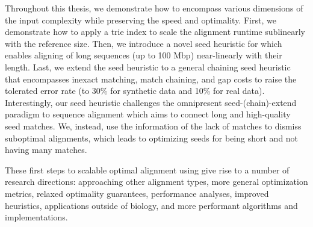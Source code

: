 Throughout this thesis, we demonstrate how to encompass various dimensions of
the input complexity while preserving the speed and optimality. First, we
demonstrate how to apply a trie index to scale the alignment runtime sublinearly
with the reference size. Then, we introduce a novel seed heuristic for \A which
enables aligning of long sequences (up to 100 Mbp) near-linearly with their
length. Last, we extend the seed heuristic to a general chaining seed heuristic
that encompasses inexact matching, match chaining, and gap costs to raise the
tolerated error rate (to 30\% for synthetic data and 10\% for real data).
Interestingly, our seed heuristic challenges the omnipresent seed-(chain)-extend
paradigm to sequence alignment which aims to connect long and high-quality seed
matches. We, instead, use the information of the lack of matches to dismiss
suboptimal alignments, which leads to optimizing seeds for being short and not
having many matches.

These first steps to scalable optimal alignment using \A give rise to a number
of research directions: approaching other alignment types, more general
optimization metrics, relaxed optimality guarantees, performance analyses,
improved heuristics, applications outside of biology, and more performant
algorithms and implementations.